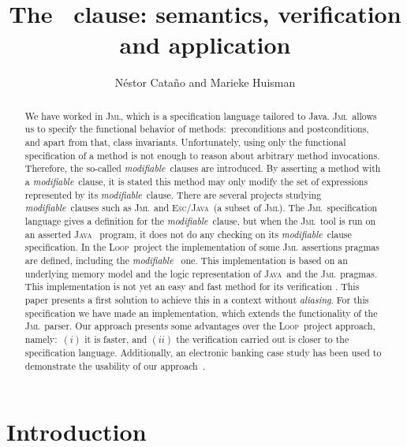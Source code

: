 \documentclass[a4paper]{llncs}
\title{The \modif~clause: semantics, verification and application}
\author{
  N\'estor Cata\~no and Marieke Huisman
}
\institute{
  INRIA Sophia-Antipolis, France \\
  \email{\{Nestor.Catano, Marieke.Huisman\}@sophia.inria.fr}
}
\newcommand{\jml}{\textsc{Jml}}
\newcommand{\escj}{\textsc{Esc/Java}}
\newcommand{\loopp}{\textsc{Loop}}
\newcommand{\java}{\textsc{Java}}
\newcommand{\modif}{\textit{modifiable}}
\begin{document}
\fussy
\maketitle

\begin{abstract}
We have worked in \jml, which is a specification language
tailored to Java. \jml~allows us to specify the functional behavior
of methods$:$ preconditions and postconditions, and apart from that,
class invariants. Unfortunately, using only the functional
specification of a
method is not enough to reason about arbitrary method
invocations. Therefore, the so-called \modif~clauses are
introduced. By asserting a
method with a \modif~clause, it is stated this method may only modify
the set of expressions represented by its \modif~clause. There are
several projects studying \modif~clauses such as \jml~and \escj~(a subset of
\jml). The \jml~specification language gives a definition for the
\modif~clause, but when the \jml~tool is run on an asserted \java~
program, it does not do any checking on its \modif~clause
specification. In the \loopp~project the
implementation of some \jml~assertions pragmas are defined, including
the \modif~ one. This implementation is based on an underlying memory
model
and the logic representation of \java~and the \jml~pragmas. This
implementation is not yet an easy and fast method for its verification
. This paper presents a first solution to achieve this in a context
without \textit{aliasing}. For this specification we have made
an implementation, which extends the functionality of the
\jml~parser. Our approach presents some advantages over the
\loopp~project approach, namely$:$ $(i)$ it is faster, and $(ii)$ the
verification carried out is closer to the specification
language. Additionally, an electronic banking case study has been used
to demonstrate the usability of our approach~\cite{CH02}.
\end{abstract}


\section{Introduction}
\label{sec-intro}
\end{document}
